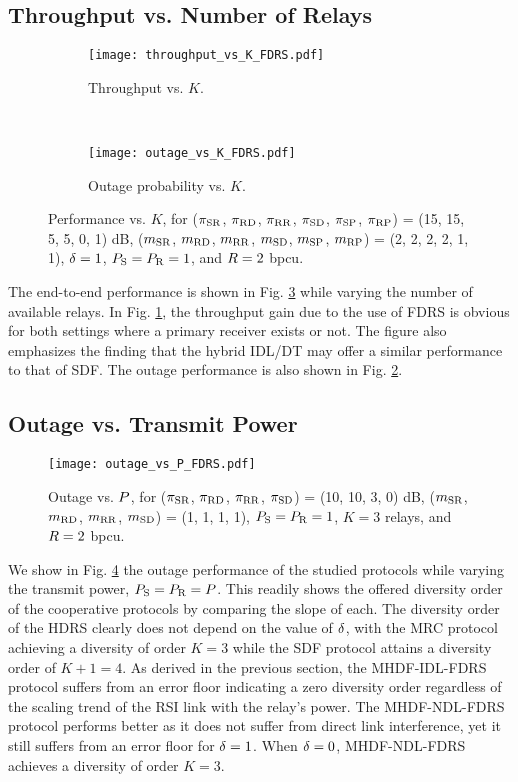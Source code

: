 \documentclass[10pt,journal]{IEEEtran}
\newcommand{\figscl}{0.7}
\begin{document}
\subsection{Throughput vs. Number of Relays}
\begin{figure}
\centering
\centering
\begin{subfigure}[t]{\figscl\columnwidth}
\centering
\texttt{[image: throughput\_vs\_K\_FDRS.pdf]}
\caption{Throughput vs. $K$.}
\label{throughput_vs_K}
\end{subfigure}\\
\begin{subfigure}[t]{\figscl\columnwidth}
\centering
\texttt{[image: outage\_vs\_K\_FDRS.pdf]}
\caption{Outage probability vs. $K$.}
\label{outage_vs_K}
\end{subfigure}
\caption{Performance vs. $K$, for (${\pi_{{\rm S} {\rm R}}}$, ${\pi_{{\rm R} {\rm D}}}$, ${\pi_{{\rm R} {\rm R}}}$, ${\pi_{{\rm S} {\rm D}}}$, ${\pi_{{\rm S} {\rm P}}}$, ${\pi_{{\rm R} {\rm P}}}$) = (15, 15, 5, 5, 0, 1) dB,  (${m_{{\rm S} {\rm R}}}$, ${m_{{\rm R} {\rm D}}}$, ${m_{{\rm R} {\rm R}}}$, ${m_{{\rm S} {\rm D}}}$, ${m_{{\rm S} {\rm P}}}$, ${m_{{\rm R} {\rm P}}}$) = (2, 2, 2, 2, 1, 1), $\delta=1$, $P_{{\rm S}}=P_{{\rm R}}=1$, and $R=2$ bpcu.}
\label{performance_vs_K}
\vspace{-7mm}
\end{figure}
The end-to-end performance is shown in Fig. \ref{performance_vs_K} while varying the number of available relays. In Fig. \ref{throughput_vs_K}, the throughput gain due to the use of \ac{FDRS} is obvious for both settings where a primary receiver exists or not. The figure also emphasizes the finding that the hybrid \ac{IDL}/\ac{DT} may offer a similar performance to that of \ac{SDF}. The outage performance is also shown in Fig. \ref{outage_vs_K}.

\subsection{Outage vs. Transmit Power}
\begin{figure}
\centering
\texttt{[image: outage\_vs\_P\_FDRS.pdf]}
\caption{Outage vs. $P$, for (${\pi_{{\rm S} {\rm R}}}$, ${\pi_{{\rm R} {\rm D}}}$, ${\pi_{{\rm R} {\rm R}}}$, ${\pi_{{\rm S} {\rm D}}}$) = (10, 10, 3, 0) dB,  (${m_{{\rm S} {\rm R}}}$, ${m_{{\rm R} {\rm D}}}$, ${m_{{\rm R} {\rm R}}}$, ${m_{{\rm S} {\rm D}}}$) = (1, 1, 1, 1), $P_{{\rm S}}=P_{{\rm R}}=1$, $K=3$ relays, and $R=2$ bpcu.}
\label{outage_vs_P_FDRS}
\vspace{-5mm}
\end{figure}
We show in Fig. \ref{outage_vs_P_FDRS} the outage performance of the studied protocols while varying the transmit power, $P_{{\rm S}}=P_{{\rm R}}=P$. This readily shows the offered diversity order of the cooperative protocols by comparing the slope of each. The diversity order of the \ac{HDRS} clearly does not depend on the value of $\delta$, with the \ac{MRC} protocol achieving a diversity of order $K=3$ while the \ac{SDF} protocol attains a diversity order of $K+1=4$. As derived in the previous section, the \ac{MHDF}-\ac{IDL}-\ac{FDRS} protocol suffers from an error floor indicating a zero diversity order regardless of the scaling trend of the \ac{RSI} link with the relay's power. The \ac{MHDF}-\ac{NDL}-\ac{FDRS} protocol performs better as it does not suffer from direct link interference, yet it still suffers from an error floor for $\delta=1$. When $\delta=0$, \ac{MHDF}-\ac{NDL}-\ac{FDRS} achieves a diversity of order $K=3$.
\end{document}
